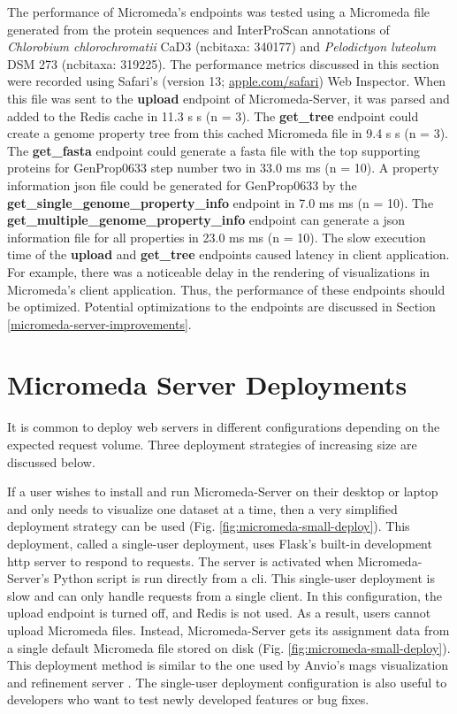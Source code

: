 The performance of Micromeda's endpoints was tested using a Micromeda file 
generated from the protein sequences and InterProScan annotations of 
\textit{Chlorobium chlorochromatii} CaD3 (\gls{ncbitaxa}: 340177) and 
\textit{Pelodictyon luteolum} DSM 273 (\gls{ncbitaxa}:  319225). 
The performance metrics discussed in this section were recorded using Safari's 
(version 13; \href{http://apple.com/safari}{apple.com/safari}) Web Inspector.
When this file was sent to the \textbf{upload} endpoint of Micromeda-Server, it 
was parsed and added to the Redis cache in 11.3 s  s (\gls{n} = 3). 
The \textbf{get\_tree} endpoint could create a genome property tree from this 
cached Micromeda file in 9.4 s  s (\gls{n} = 3). The 
\textbf{get\_fasta} endpoint could generate a \gls{fasta} file with the top 
supporting proteins for GenProp0633 step number two in 33.0 ms  ms 
(\gls{n} = 10). A property information \gls{json} file could be generated for 
GenProp0633 by the \textbf{get\_single\_genome\_property\_info} endpoint in 7.0 
ms  ms (\gls{n} = 10). The 
\textbf{get\_multiple\_genome\_property\_info} endpoint can generate a 
\gls{json} information file for all properties in 23.0 ms  ms 
(\gls{n} = 10). The slow execution time of the \textbf{upload} and 
\textbf{get\_tree} endpoints caused latency in client application. For 
example, there was a noticeable delay in the rendering of visualizations in 
Micromeda's client application. Thus, the performance of these endpoints should 
be optimized. Potential optimizations to the endpoints are discussed in Section 
\ref{micromeda-server-improvements}.

\section{Micromeda Server Deployments} \label{micromeda-server-deployments}

It is common to deploy web servers in different configurations depending on the 
expected request volume. Three deployment strategies of increasing size are 
discussed below. 

If a user wishes to install and run Micromeda-Server on their desktop or laptop 
and only needs to visualize one dataset at a time, then a very simplified 
deployment strategy can be used (Fig. \ref{fig:micromeda-small-deploy}). This 
deployment, called a single-user deployment, uses Flask's built-in development 
\gls{http} server to respond to requests. The server is activated when 
Micromeda-Server's Python script is run directly from a \gls{cli}. This 
single-user deployment is slow and can only handle requests from a single 
client. In this configuration, the upload endpoint is turned off, and Redis is 
not used. As a result, users cannot upload Micromeda files. Instead, 
Micromeda-Server gets its assignment data from a single default Micromeda file 
stored on disk (Fig. \ref{fig:micromeda-small-deploy}). This deployment method 
is similar to the one used by Anvio's \gls{mags} visualization and refinement 
server \cite{eren2015anvi}. The single-user deployment configuration is also 
useful to developers who want to test newly developed features or bug fixes.

